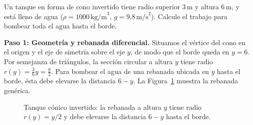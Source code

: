 \begin{example}
Un tanque en forma de cono invertido tiene radio superior $3\,\text{m}$
y altura $6\,\text{m}$, y está lleno de agua
($\rho=1000\,\text{kg/m}^3$, $g=9.8\,\text{m/s}^2$). Calcule el trabajo
para bombear toda el agua hasta el borde.

\begin{myproof}
\textbf{Paso 1: Geometría y rebanada diferencial.}
Situamos el vértice del cono en el origen y el eje de simetría sobre el
eje $y$, de modo que el borde queda en $y=6$. Por semejanza de triángulos,
la sección circular a altura $y$ tiene radio $r(y)=\frac{3}{6}y=\frac{y}{2}$.
Para bombear el agua de una rebanada ubicada en $y$ hasta el borde, ésta
debe elevarse la distancia $6-y$.
La Figura~\ref{fig:trabajo_tanque_conico} muestra la rebanada genérica.

\begin{figure}[H]
\centering
{}
\caption{Tanque cónico invertido: la rebanada a altura $y$ tiene radio $r(y)=y/2$ y debe elevarse la distancia $6-y$ hasta el borde.}
\label{fig:trabajo_tanque_conico}
\end{figure}


\end{myproof}
\end{example}

